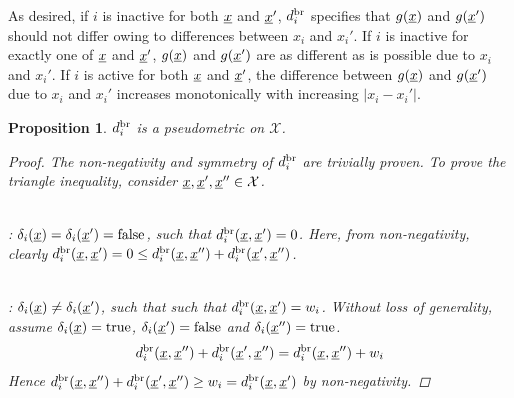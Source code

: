 \documentclass[letterpaper]{article}
\newcommand{\vect}[1]{\underline{\smash{#1}}}
\renewcommand{\v}[1]{\vect{#1}}
\newcommand{\sX}{\mathcal{X}}
\newcommand{\br}{^{\text{\textnormal{br}}}}
\newtheorem{prop}[thm]{Proposition}
\begin{document}
As desired, if $i$ is inactive for both $\v{x}$ and $\v{x}'$, $d\br_i$ specifies that $g(\v{x})$ and $g(\v{x}')$ should not differ owing to differences between $x_i$ and $x_i'$. If $i$ is inactive for exactly one of $\v{x}$ and $\v{x}'$, $g(\v{x})$ and $g(\v{x}')$ are as different as is possible due to $x_i$ and $x_i'$. If $i$ is active for both $\v{x}$ and $\v{x}'$, the difference between $g(\v{x})$ and $g(\v{x}')$ due to $x_i$ and $x_i'$ increases monotonically with increasing $\left|x_i-x_i'\right|$.

\begin{prop}
  $d\br_i$ is a pseudometric on $\sX$. \label{prop:dbr_pseudometric}
\begin{proof}
The non-negativity and symmetry of $d\br_i$ are trivially proven. To prove the triangle inequality, consider $\v{x}, \v{x}', \v{x}'' \in \sX$. 

~\\: $\delta_i(\v{x}) = \delta_i(\v{x}') = \textrm{false}$, such that $d\br_i(\v{x},\v{x}') = 0$. Here, from non-negativity, clearly $d\br_i(\v{x},\v{x}') = 0 \leq d\br_i(\v{x},\v{x}'') + d\br_i(\v{x}',\v{x}'')$.

~\\: $\delta_i(\v{x}) \neq \delta_i(\v{x}')$, such that such that  $d\br_i(\v{x},\v{x}') = w_i$.  Without loss of generality, assume $\delta_i(\v{x}) = \text{true}$, $\delta_i(\v{x}') = \text{false}$ and $\delta_i(\v{x}'') = \text{true}$. 
\begin{align}
d\br_i(\v{x},\v{x}'') + d\br_i(\v{x}',\v{x}'') = d\br_i(\v{x},\v{x}'')  + w_i
\end{align}
Hence $d\br_i(\v{x},\v{x}'') + d\br_i(\v{x}',\v{x}'') \geq w_i = d\br_i(\v{x},\v{x}')$ by non-negativity.


\end{proof}
\end{prop}
\end{document}
